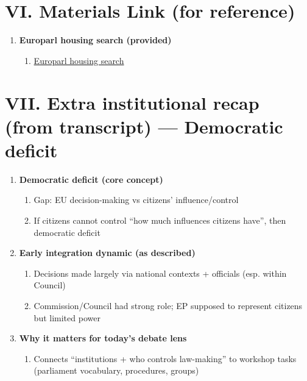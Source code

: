 \documentclass[10pt,a4paper]{article}
\begin{document}
\section*{VI. Materials Link (for reference)}
\begin{enumerate}[label=\Alph*.]
\item \textbf{Europarl housing search (provided)}
  \begin{enumerate}[label=\arabic*.]
  \item \href{https://www.europarl.europa.eu/portal/en/search?planet=_all&searchQuery=housing}{Europarl housing search}
  \end{enumerate}
\end{enumerate}

\section*{VII. Extra institutional recap (from transcript) --- Democratic deficit}
\begin{enumerate}[label=\Alph*.]
\item \textbf{Democratic deficit (core concept)}
  \begin{enumerate}[label=\arabic*.]
  \item Gap: EU decision-making vs citizens' influence/control
  \item If citizens cannot control ``how much influences citizens have'', then democratic deficit
  \end{enumerate}
\item \textbf{Early integration dynamic (as described)}
  \begin{enumerate}[label=\arabic*.]
  \item Decisions made largely via national contexts + officials (esp. within Council)
  \item Commission/Council had strong role; EP supposed to represent citizens but limited power
  \end{enumerate}
\item \textbf{Why it matters for today's debate lens}
  \begin{enumerate}[label=\arabic*.]
  \item Connects ``institutions + who controls law-making'' to workshop tasks (parliament vocabulary, procedures, groups)
  \end{enumerate}
\end{enumerate}
\end{document}
